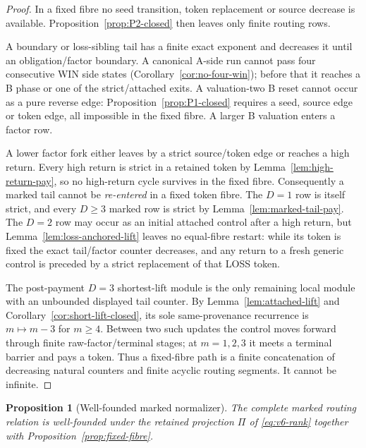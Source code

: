 \documentclass[11pt]{article}
\newtheorem{proposition}[theorem]{Proposition}
\begin{document}
\begin{proof}
In a fixed fibre no seed transition, token replacement or source decrease is
available.  Proposition~\ref{prop:P2-closed} then leaves only finite routing
rows.

A boundary or loss-sibling tail has a finite exact exponent and decreases it
until an obligation/factor boundary.  A canonical A-side run cannot pass four
consecutive WIN side states (Corollary~\ref{cor:no-four-win}); before that it
reaches a B phase or one of the strict/attached exits.  A valuation-two B
reset cannot occur as a pure reverse edge: Proposition~\ref{prop:P1-closed}
requires a seed, source edge or token edge, all impossible in the fixed
fibre.  A larger B valuation enters a factor row.

A lower factor fork either leaves by a strict source/token edge or reaches a
high return.  Every high return is strict in a retained token by
Lemma~\ref{lem:high-return-pay}, so no high-return cycle survives in the
fixed fibre.  Consequently a marked tail cannot be \emph{re-entered} in a
fixed token fibre.  The $D=1$ row is itself strict, and every $D\ge3$ marked
row is strict by Lemma~\ref{lem:marked-tail-pay}.  The $D=2$ row may occur as an initial attached control after a high return,
but Lemma~\ref{lem:loss-anchored-lift} leaves no equal-fibre restart: while
its token is fixed the exact tail/factor counter decreases, and any return to
a fresh generic control is preceded by a strict replacement of that LOSS
token.

The post-payment $D=3$ shortest-lift module is the only remaining local module
with an unbounded displayed tail counter.  By Lemma~\ref{lem:attached-lift}
and Corollary~\ref{cor:short-lift-closed}, its sole same-provenance recurrence
is $m\mapsto m-3$ for $m\ge4$. Between two such updates the control moves
forward through finite raw-factor/terminal stages; at $m=1,2,3$ it meets a
terminal barrier and pays a token. Thus a fixed-fibre path is a finite
concatenation of decreasing natural counters and finite acyclic routing
segments. It cannot be infinite.
\end{proof}

\begin{proposition}[Well-founded marked normalizer]\label{prop:normalizer}
The complete marked routing relation is well-founded under the retained
projection $\Pi$ of \eqref{eq:v6-rank} together with
Proposition~\ref{prop:fixed-fibre}.
\end{proposition}
\end{document}
